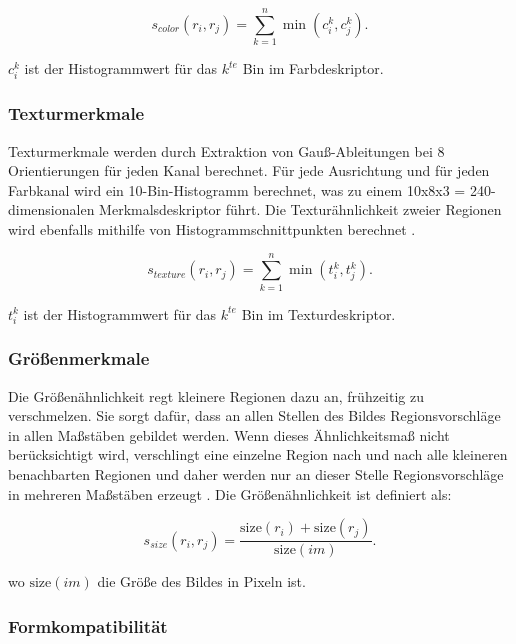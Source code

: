 \begin{equation}
	s_{color}(r_{i},r_{j}) = \sum_{k=1}^{n} \min(c_{i}^k,c_{j}^k).
\end{equation}

$c^k_i$ ist der Histogrammwert für das $k^{te}$ \gls{Bin} im Farbdeskriptor.

\subsubsection*{Texturmerkmale}

Texturmerkmale werden durch Extraktion von Gauß-Ableitungen bei 8 Orientierungen für jeden Kanal berechnet. Für jede Ausrichtung und für jeden Farbkanal wird ein 10-\gls{Bin}-Histogramm berechnet, was zu einem 10x8x3 = 240-dimensionalen Merkmalsdeskriptor führt.
Die Texturähnlichkeit zweier Regionen wird ebenfalls mithilfe von Histogrammschnittpunkten berechnet \cite{learnopencv}.

\begin{equation}
	s_{texture}(r_{i},r_{j}) = \sum_{k=1}^{n} \min(t_{i}^k,t_{j}^k).
\end{equation}

$t^k_i$ ist der Histogrammwert für das $k^{te}$ Bin im Texturdeskriptor.

\subsubsection*{Größenmerkmale}

Die Größenähnlichkeit regt kleinere Regionen dazu an, frühzeitig zu verschmelzen. Sie sorgt dafür, dass an allen Stellen des Bildes Regionsvorschläge in allen Maßstäben gebildet werden. Wenn dieses Ähnlichkeitsmaß nicht berücksichtigt wird, verschlingt eine einzelne Region nach und nach alle kleineren benachbarten Regionen und daher werden nur an dieser Stelle Regionsvorschläge in mehreren Maßstäben erzeugt \cite{learnopencv}. Die Größenähnlichkeit ist definiert als:

\begin{equation}
	s_{size}(r_{i},r_{j}) = \frac{\text{size}(r_i) + \text{size}(r_j)}{\text{size}(im)}.
\end{equation}

wo $\text{size}(im)$ die Größe des Bildes in Pixeln ist.

\subsubsection*{Formkompatibilität}

